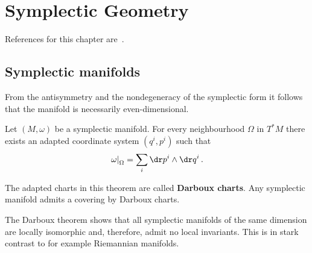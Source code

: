 \chapter{Symplectic Geometry}\label{chapter:symplectic}

    References for this chapter are~\cite{mcduff_introduction_2017,cardin_elementary_2015}.

\section{Symplectic manifolds}


    \begin{property}[Dimension]
        From the antisymmetry and the nondegeneracy of the symplectic form it follows that the manifold is necessarily even-dimensional.
    \end{property}

    \begin{theorem}[Darboux]
        Let $(M,\omega)$ be a symplectic manifold. For every neighbourhood $\Omega$ in $T^*M$ there exists an adapted coordinate system $(q^i,p^i)$ such that
        \begin{gather}
            \left.\omega\right|_\Omega = \sum_i\dr p^i\wedge\dr q^i\,.
        \end{gather}
    \end{theorem}
    The adapted charts in this theorem are called \textbf{Darboux charts}. Any symplectic manifold admits a covering by Darboux charts.
    \begin{remark}
        The Darboux theorem shows that all symplectic manifolds of the same dimension are locally isomorphic and, therefore, admit no local invariants. This is in stark contrast to for example Riemannian manifolds.
    \end{remark}

